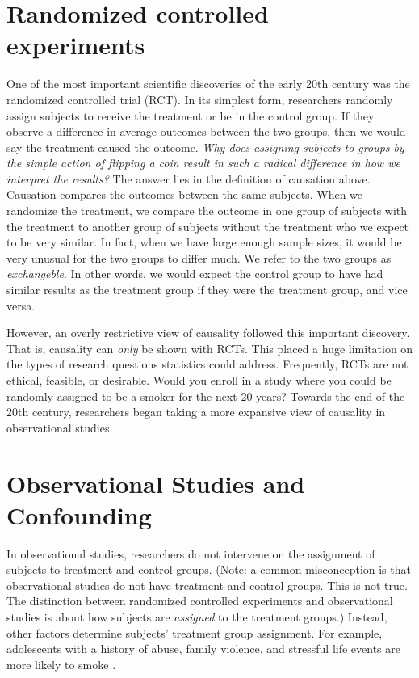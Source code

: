 \documentclass[]{book}
\begin{document}
\hypertarget{randomized-controlled-experiments}{%
\section{Randomized controlled experiments}\label{randomized-controlled-experiments}}

One of the most important scientific discoveries of the early 20th century was the randomized controlled trial (RCT). In its simplest form, researchers randomly assign subjects to receive the treatment or be in the control group. If they observe a difference in average outcomes between the two groups, then we would say the treatment caused the outcome. \emph{Why does assigning subjects to groups by the simple action of flipping a coin result in such a radical difference in how we interpret the results?} The answer lies in the definition of causation above. Causation compares the outcomes between the same subjects. When we randomize the treatment, we compare the outcome in one group of subjects with the treatment to another group of subjects without the treatment who we expect to be very similar. In fact, when we have large enough sample sizes, it would be very unusual for the two groups to differ much. We refer to the two groups as \emph{exchangeble}. In other words, we would expect the control group to have had similar results as the treatment group if they were the treatment group, and vice versa.

However, an overly restrictive view of causality followed this important discovery. That is, causality can \emph{only} be shown with RCTs. This placed a huge limitation on the types of research questions statistics could address. Frequently, RCTs are not ethical, feasible, or desirable. Would you enroll in a study where you could be randomly assigned to be a smoker for the next 20 years? Towards the end of the 20th century, researchers began taking a more expansive view of causality in observational studies.

\hypertarget{observational-studies-and-confounding}{%
\section{Observational Studies and Confounding}\label{observational-studies-and-confounding}}

In observational studies, researchers do not intervene on the assignment of subjects to treatment and control groups. (Note: a common misconception is that observational studies do not have treatment and control groups. This is not true. The distinction between randomized controlled experiments and observational studies is about how subjects are \emph{assigned} to the treatment groups.) Instead, other factors determine subjects' treatment group assignment. For example, adolescents with a history of abuse, family violence, and stressful life events are more likely to smoke \citep{ellickson2001high, simantov2000health}.
\end{document}
